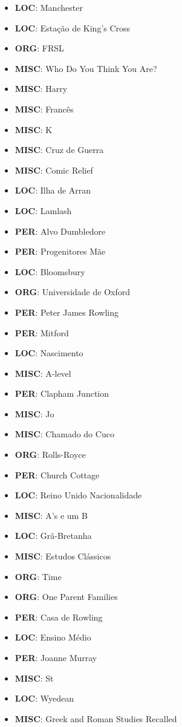 \documentclass{article}
\begin{document}
\begin{itemize}
\item \textbf{LOC}: Manchester
\item \textbf{LOC}: Estação de King's Cross
\item \textbf{ORG}: FRSL
\item \textbf{MISC}: Who Do You Think You Are?
\item \textbf{MISC}: Harry
\item \textbf{MISC}: Francês
\item \textbf{MISC}: K
\item \textbf{MISC}: Cruz de Guerra
\item \textbf{MISC}: Comic Relief
\item \textbf{LOC}: Ilha de Arran
\item \textbf{LOC}: Lamlash
\item \textbf{PER}: Alvo Dumbledore
\item \textbf{PER}: Progenitores Mãe
\item \textbf{LOC}: Bloomsbury
\item \textbf{ORG}: Universidade de Oxford
\item \textbf{PER}: Peter James Rowling
\item \textbf{PER}: Mitford
\item \textbf{LOC}: Nascimento
\item \textbf{MISC}: A-level
\item \textbf{PER}: Clapham Junction
\item \textbf{MISC}: Jo
\item \textbf{MISC}: Chamado do Cuco
\item \textbf{ORG}: Rolls-Royce
\item \textbf{PER}: Church Cottage
\item \textbf{LOC}: Reino Unido Nacionalidade
\item \textbf{MISC}: A's e um B
\item \textbf{LOC}: Grã-Bretanha
\item \textbf{MISC}: Estudos Clássicos
\item \textbf{ORG}: Time
\item \textbf{ORG}: One Parent Families
\item \textbf{PER}: Casa de Rowling
\item \textbf{LOC}: Ensino Médio
\item \textbf{PER}: Joanne Murray
\item \textbf{MISC}: St
\item \textbf{LOC}: Wyedean
\item \textbf{MISC}: Greek and Roman Studies Recalled

\end{itemize}
\end{document}

